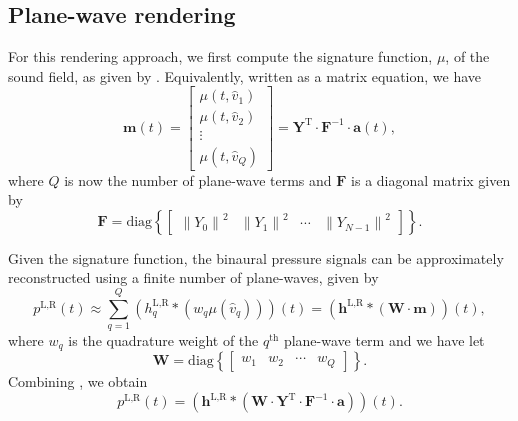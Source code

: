 \subsection{Plane-wave rendering}\label{sec:02_Acoustical_Theory:PW_Quadrature_Binaural}
For this rendering approach, we first compute the signature function, $\mu$, of the sound field,
as given by .
Equivalently, written as a matrix equation, we have
\begin{equation}\label{eq:02_Acoustical_Theory:A2mu_Matrix}
\mathbf{m}(t) = 
\begin{bmatrix}
\mu(t,\hat{v}_1) \\ \mu(t,\hat{v}_2) \\ \vdots \\ \mu(t,\hat{v}_Q)
\end{bmatrix} 
= \mathbf{Y}^{\textrm{T}} \cdot \mathbf{F}^{-1} \cdot \mathbf{a}(t),
\end{equation}
where $Q$ is now the number of plane-wave terms and $\mathbf{F}$ is a diagonal matrix given by
\begin{equation}
\mathbf{F} = \text{diag} \left\{ \begin{bmatrix} \left\|Y_0\right\|^{2} & \left\|Y_1\right\|^{2} & \cdots & \left\|Y_{N-1}\right\|^{2} \end{bmatrix} \right\}.
\end{equation}

Given the signature function, the binaural pressure signals can be approximately reconstructed using a finite number of plane-waves, given by \citep{Duraiswami2005a}
\begin{equation}\label{eq:02_Acoustical_Theory:PW_Quadrature_Binaural}
p^{\text{L,R}}(t) \approx \sum_{q=1}^Q \left( h_{q}^{\text{L,R}} \ast \left(w_q \mu(\hat{v}_q) \right) \right) (t)
 = \left(\mathbf{h}^{\text{L,R}} \ast \left( \mathbf{W} \cdot \mathbf{m} \right) \right)(t),
\end{equation}
where $w_q$ is the quadrature weight of the $q^\textrm{th}$ plane-wave term and we have let
\begin{equation}\label{eq:02_Acoustical_Theory:PW_Quadrature_Weights}
\mathbf{W} = \text{diag} \left\{ \begin{bmatrix} w_1 & w_2 & \cdots & w_Q \end{bmatrix} \right\}.
\end{equation}
Combining , we obtain
\begin{equation}\label{eq:02_Acoustical_Theory:PW_Quadrature_Binaural_Matrix}
p^{\text{L,R}}(t) = \left( \mathbf{h}^{\text{L,R}} \ast \left( \mathbf{W} \cdot \mathbf{Y}^{\textrm{T}} \cdot \mathbf{F}^{-1} \cdot \mathbf{a} \right) \right) (t).
\end{equation}

